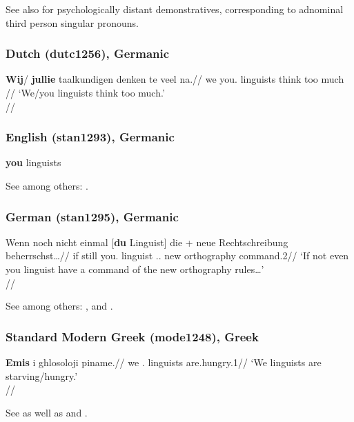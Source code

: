 See also \citet{johannessen2008} for psychologically distant demonstratives, corresponding to adnominal third person singular pronouns. 

\subsubsection{Dutch (dutc1256), Germanic}

\ex
\begingl
\gla \textbf{Wij}/ \textbf{jullie} taalkundigen denken te veel na.//
\glb we you.\Pl{} linguists think too much \Prtcl{}//
\glft `We/you linguists think too much.'\\\citep[52, (23a)]{corver2008vocative}//
\endgl
\xe 


\subsubsection{English (stan1293), Germanic}

\ex \textbf{you} linguists\xe

See among others: \citet{postal1969, delormedougherty1972, sommerstein1972, pesetsky1978, keizer2016}.

\subsubsection{German (stan1295), Germanic}

\ex
\begingl
\gla Wenn noch nicht einmal [\textbf{du} Linguist] die + neue Rechtschreibung beherrschst\ldots//
\glb if still \Neg{} \Prtcl{} you.\Sg{} linguist \Det.\Acc.\Sg{} new orthography command.2\Sg{}//
\glft `If not even you linguist have a command of the new orthography rules\ldots' \\{\citep[after][100, (36)]{rauh2004}}//
\endgl
\xe

See among others: \citet[ch. 6]{lawrenz1993}, \citet{rauh2003, rauh2004} and \citet{roehrs2005}.

\subsubsection{Standard Modern Greek (mode1248), Greek}

\ex 
\begingl
\gla \textbf{Emis} i ghlosoloji piname.//
\glb we \Det.\Pl{} linguists are.hungry.1\Pl{}//
\glft `We linguists are starving/hungry.'\\\citep[after][114, (12c)]{lekakouszendroi2012}//
\endgl
\xe 

See \citet{stavrou1995} as well as \citet[chs. 1/2]{choi2014phd} and \citet[sec. 5]{hoehn2015unagr}.

